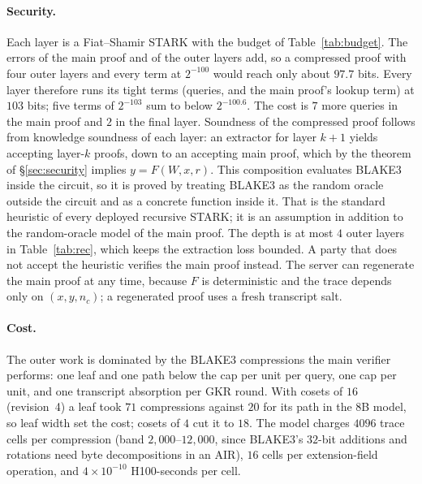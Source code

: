 \documentclass[11pt]{article}
\begin{document}
\paragraph{Security.}
Each layer is a Fiat--Shamir STARK with the budget of Table~\ref{tab:budget}.
The errors of the main proof and of the outer layers add, so a compressed proof with four outer layers and every term at \(2^{-100}\) would reach only about \(97.7\) bits.
Every layer therefore runs its tight terms (queries, and the main proof's lookup term) at \(103\) bits; five terms of \(2^{-103}\) sum to below \(2^{-100.6}\).
The cost is \(7\) more queries in the main proof and \(2\) in the final layer.
Soundness of the compressed proof follows from knowledge soundness of each layer: an extractor for layer \(k+1\) yields accepting layer-\(k\) proofs, down to an accepting main proof, which by the theorem of \S\ref{sec:security} implies \(y = F(W, x, r)\).
This composition evaluates BLAKE3 inside the circuit, so it is proved by treating BLAKE3 as the random oracle outside the circuit and as a concrete function inside it.
That is the standard heuristic of every deployed recursive STARK; it is an assumption in addition to the random-oracle model of the main proof.
The depth is at most \(4\) outer layers in Table~\ref{tab:rec}, which keeps the extraction loss bounded.
A party that does not accept the heuristic verifies the main proof instead.
The server can regenerate the main proof at any time, because \(F\) is deterministic and the trace depends only on \((x, y, n_c)\); a regenerated proof uses a fresh transcript salt.

\paragraph{Cost.}
The outer work is dominated by the BLAKE3 compressions the main verifier performs: one leaf and one path below the cap per unit per query, one cap per unit, and one transcript absorption per GKR round.
With cosets of \(16\) (revision~4) a leaf took \(71\) compressions against \(20\) for its path in the 8B model, so leaf width set the cost; cosets of \(4\) cut it to \(18\).
The model charges \(4096\) trace cells per compression (band \(2{,}000\)--\(12{,}000\), since BLAKE3's \(32\)-bit additions and rotations need byte decompositions in an AIR), \(16\) cells per extension-field operation, and \(4\times 10^{-10}\) H100-seconds per cell.
\end{document}
